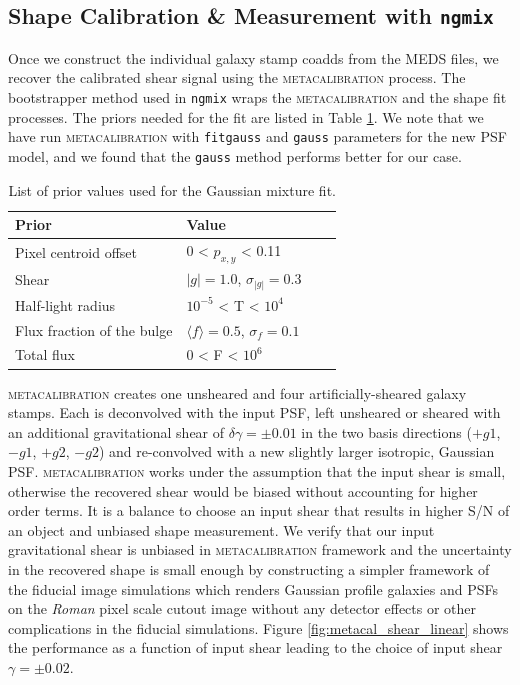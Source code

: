 \documentclass[fleqn,usenatbib]{mnras}
\begin{document}
\par

\subsection{Shape Calibration \& Measurement with \texttt{ngmix}}
\label{subsec:mcal}
Once we construct the individual galaxy stamp coadds from the MEDS files, we recover the calibrated shear signal using the \textsc{metacalibration} process. The bootstrapper method used in \texttt{ngmix} wraps the \textsc{metacalibration} and the shape fit processes. The priors needed for the fit are listed in Table \ref{tab:priors}. We note that we have run \textsc{metacalibration} with \texttt{fitgauss} and \texttt{gauss} parameters for the new PSF model, and we found that the \texttt{gauss} method performs better for our case.

\begin{table}
    \centering
    \begin{tabular}{|p{3cm}||p{3cm}|p{3cm}|p{3cm}|}
    \hline
    Prior & Value \\
    \hline
    Pixel centroid offset & 0 < $p_{x,y}$ < 0.11\\
    Shear & $|g|=1.0$, $\sigma_{|g|} = 0.3$\\
    Half-light radius & $10^{-5}$ < T < $10^{4}$\\
    Flux fraction of the bulge  & $\langle f\rangle = 0.5$, $\sigma_{f} = 0.1$\\
    Total flux & $0$ < F < $10^{6}$\\
    \hline
    \end{tabular}
    \caption{List of prior values used for the Gaussian mixture fit.}
    \label{tab:priors}
\end{table}

\textsc{metacalibration} creates one unsheared and four artificially-sheared galaxy stamps. Each is deconvolved with the input PSF, left unsheared or sheared with an additional gravitational shear of $\delta\gamma=\pm 0.01$ in the two basis directions ($+g1$, $-g1$, $+g2$, $-g2$) and re-convolved with a new slightly larger isotropic, Gaussian PSF. \textsc{metacalibration} works under the assumption that the input shear is small, otherwise the recovered shear would be biased without accounting for higher order terms. It is a balance to choose an input shear that results in higher S/N of an object and unbiased shape measurement. We verify that our input gravitational shear is unbiased in \textsc{metacalibration} framework and the uncertainty in the recovered shape is small enough by constructing a simpler framework of the fiducial image simulations which renders Gaussian profile galaxies and PSFs on the \emph{Roman} pixel scale cutout image without any detector effects or other complications in the fiducial simulations. Figure \ref{fig:metacal_shear_linear} shows the performance as a function of input shear leading to the choice of input shear $\gamma=\pm 0.02$. 
\end{document}
